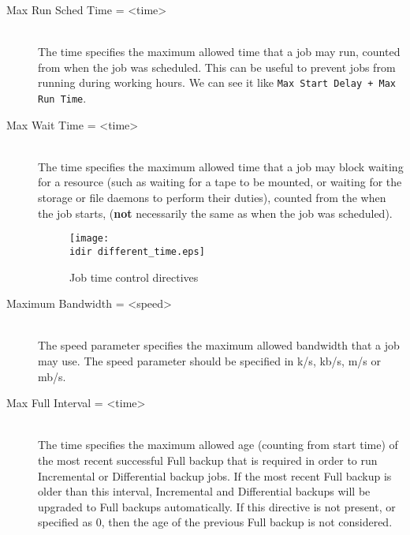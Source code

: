 \begin{description}
\item [Max Run Sched Time = {\textless}time{\textgreater}] \hfill \\
The time specifies the maximum allowed time that a job may run, counted from
when the job was scheduled. This can be useful to prevent jobs from running
during working hours. We can see it like \texttt{Max Start Delay + Max Run
Time}.

\item [Max Wait Time = {\textless}time{\textgreater}] \hfill \\
The time specifies the maximum allowed time that a job may block waiting
for a resource (such as waiting for a tape to be mounted, or waiting for
the storage or file daemons to perform their duties), counted from the
when the job starts, ({\bf not} necessarily the same as when the job was
scheduled).

\begin{figure}[htbp]
  \centering
  \texttt{[image: \\idir different\_time.eps]}
  \caption{Job time control directives}
  \label{fig:differenttime}
\end{figure}

\item [Maximum Bandwidth = {\textless}speed{\textgreater}] \hfill \\
The speed parameter specifies the maximum allowed bandwidth that a job may
use. The speed parameter should be specified in k/s, kb/s, m/s or mb/s.

\item [Max Full Interval = {\textless}time{\textgreater}] \hfill \\
The time specifies the maximum allowed age (counting from start time) of
the most recent successful Full backup that is required in order to run
Incremental or Differential backup jobs. If the most recent Full backup
is older than this interval, Incremental and Differential backups will be
upgraded to Full backups automatically. If this directive is not present,
or specified as 0, then the age of the previous Full backup is not
considered.


\end{description}
